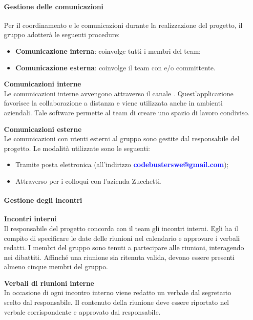 \paragraph{Gestione delle comunicazioni}
Per il coordinamento e le comunicazioni durante la realizzazione del progetto, il gruppo adotterà le seguenti procedure: 
\begin{itemize}
\item\textbf{Comunicazione interna}: coinvolge tutti i membri del team;
\item\textbf{Comunicazione esterna}: coinvolge il team con  e/o committente.
\end{itemize}

\mbox{}

\textbf{Comunicazioni interne} \\
Le comunicazioni interne avvengono attraverso il canale . Quest'applicazione favorisce la collaborazione a distanza e viene utilizzata anche in ambienti aziendali. Tale software permette al team di creare uno spazio di lavoro condiviso.\\

\mbox{}

\textbf{Comunicazioni esterne} \\
Le comunicazioni con utenti esterni al gruppo sono gestite dal responsabile del progetto. Le modalità utilizzate sono le seguenti: 
\begin{itemize}
\item Tramite posta elettronica (all'indirizzo \textcolor{blue}{\textbf{codebusterswe@gmail.com}}); 
\item Attraverso  per i colloqui con l'azienda Zucchetti.
\end{itemize} 

\paragraph{Gestione degli incontri}
\textbf{Incontri interni} \\
Il responsabile del progetto concorda con il team gli incontri interni. Egli ha il compito di specificare le date delle riunioni nel calendario e approvare i verbali redatti. I membri del gruppo sono tenuti a partecipare alle riunioni, interagendo nei dibattiti. Affinché una riunione sia ritenuta valida, devono essere presenti almeno cinque membri del gruppo.\\

\mbox{}

\textbf{Verbali di riunioni interne} \\
In occasione di ogni incontro interno viene redatto un verbale dal segretario scelto dal responsabile. Il contenuto della riunione deve essere riportato nel verbale corrispondente e approvato dal responsabile.\\


